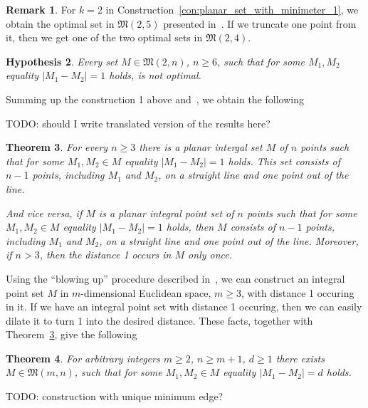 \documentclass[a4paper,14pt]{article} %
\theoremstyle{plain}
\newtheorem{theorem}{Theorem}[section]
\newtheorem{hypothesis}[theorem]{Hypothesis}
\theoremstyle{definition}
\newtheorem{remark}[theorem]{Remark}
\begin{document}
\begin{remark}
	For $k=2$ in Construction~\ref{con:planar_set_with_minimeter_1},
	we obtain the optimal set in $\mathfrak{M}(2,5)$ presented in~\cite[Fig. 1]{harborth1993upper}.
	If we truncate one point from it,
	then we get one of the two optimal sets in $\mathfrak{M}(2,4)$.
\end{remark}

\begin{hypothesis}
	Every set $M\in\mathfrak{M}(2,n)$, $n\geq 6$, such that for some $M_1,M_2$ equality $|M_1 - M_2|=1$ holds,
	is not optimal.
\end{hypothesis}



Summing up the construction 1 above and~\cite[lemma 3 and proposition 6]{our-vmmsh-2018},
we obtain the following

TODO: should I write translated version of the results here?

\begin{theorem}
	\label{thm:minimeter_1_planar}
	For every $n\geq 3$ there is a planar intergal set $M$ of $n$ points
	such that for some $M_1,M_2 \in M$ equality $|M_1 - M_2|=1$ holds.
	This set consists of $n-1$ points, including $M_1$ and $M_2$, on a straight line and one point out of the line.

	And vice versa, if $M$ is a planar integral point set of $n$ points
	such that for some $M_1,M_2 \in M$ equality $|M_1 - M_2|=1$ holds,
	then $M$ consists of $n-1$ points, including $M_1$ and $M_2$, on a straight line and one point out of the line.
	Moreover, if $n > 3$, then the distance 1 occurs in $M$ only once.
\end{theorem}

Using the ``blowing up'' procedure described in~\cite[theorem 1.3]{kurz2008bounds},
we can construct an integral point set $M$ in $m$-dimensional Euclidean space, $m\geq 3$,
with distance 1 occuring in it.
If we have an integral point set with distance 1 occuring,
then we can easily dilate it to turn 1 into the desired distance.
These facts, together with Theorem~\ref{thm:minimeter_1_planar}, give the following

\begin{theorem}
	For arbitrary integers $m \geq 2$, $n \geq m+1$, $d \geq 1$
	there exists $M\in\mathfrak{M}(m,n)$,
	such that for some $M_1, M_2\in M$ equality $|M_1 - M_2| = d$ holds.
\end{theorem}

TODO: construction with unique minimum edge?
\end{document}
